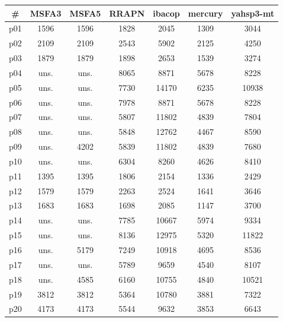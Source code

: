 \begin{tabular}{c||c|c|c|c|c|c}
\textbf{\#} & \textbf{MSFA3} & \textbf{MSFA5} & \textbf{RRAPN} & \textbf{ibacop} & \textbf{mercury} & \textbf{yahsp3-mt}\\
\hline
\hline
p01 & 1596 & 1596 & 1828 & 2045 & 1309 & 3044\\
p02 & 2109 & 2109 & 2543 & 5902 & 2125 & 4250\\
p03 & 1879 & 1879 & 1898 & 2653 & 1539 & 3274\\
p04 & uns. & uns. & 8065 & 8871 & 5678 & 8228\\
p05 & uns. & uns. & 7730 & 14170 & 6235 & 10938\\
p06 & uns. & uns. & 7978 & 8871 & 5678 & 8228\\
p07 & uns. & uns. & 5807 & 11802 & 4839 & 7804\\
p08 & uns. & uns. & 5848 & 12762 & 4467 & 8590\\
p09 & uns. & 4202 & 5839 & 11802 & 4839 & 7680\\
p10 & uns. & uns. & 6304 & 8260 & 4626 & 8410\\
p11 & 1395 & 1395 & 1806 & 2154 & 1336 & 2429\\
p12 & 1579 & 1579 & 2263 & 2524 & 1641 & 3646\\
p13 & 1683 & 1683 & 1698 & 2085 & 1147 & 3700\\
p14 & uns. & uns. & 7785 & 10667 & 5974 & 9334\\
p15 & uns. & uns. & 8136 & 12975 & 5320 & 11822\\
p16 & uns. & 5179 & 7249 & 10918 & 4695 & 8536\\
p17 & uns. & uns. & 5789 & 9659 & 4540 & 8107\\
p18 & uns. & 4585 & 6160 & 10755 & 4840 & 10521\\
p19 & 3812 & 3812 & 5364 & 10780 & 3881 & 7322\\
p20 & 4173 & 4173 & 5544 & 9632 & 3853 & 6643\\
\end{tabular}

